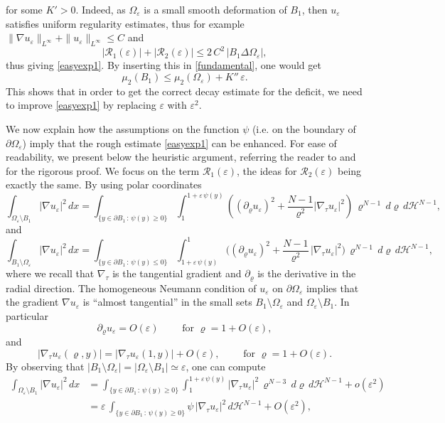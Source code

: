 \documentclass{amsart}
\theoremstyle{definition}
\numberwithin{equation}{section}
\begin{document}
for some $K'>0$. Indeed, as $\Omega_\varepsilon$ is a small smooth deformation of $B_1$, then $u_\varepsilon$ satisfies uniform regularity estimates, thus for example $\|\nabla u_\varepsilon\|_{L^\infty}+\|u_\varepsilon\|_{L^\infty}\le C$ and
\[
|\mathcal{R}_1(\varepsilon)|+|\mathcal{R}_2(\varepsilon)|\le 2\,C^2\, |B_1\Delta \Omega_\varepsilon|,
\]
thus giving \eqref{easyexp1}.
By inserting this in \eqref{fundamental}, one would get
\[
\mu_2(B_1)\leq \mu_2(\Omega_\varepsilon)+ K''\,\varepsilon.
\]
This shows that in order to get the correct decay estimate for the deficit, we need to improve \eqref{easyexp1} by replacing $\varepsilon$ with $\varepsilon^2$.
\par
We now explain how the assumptions on the function $\psi$ (i.e. on the boundary of $\partial\Omega_\varepsilon$) imply that the rough estimate \eqref{easyexp1} can be enhanced.
For ease of readability, we present below the heuristic argument, referring the reader to \cite[Section 6]{MR2899684} and \cite[Section 6]{MR2913683} for the rigorous proof.
We focus on the term $\mathcal{R}_1(\varepsilon)$, the ideas for $\mathcal{R}_2(\varepsilon)$ being exactly the same. By using polar coordinates
\[
\int_{\Omega_\varepsilon\setminus B_1}|\nabla u_\varepsilon|^2\, dx = \int_{\{y\in\partial B_1\,:\, \psi(y)\ge0 \}}\int_{1}^{1+\varepsilon\,\psi(y)}\left((\partial_\varrho u_\varepsilon)^2+\frac{N-1}{\varrho^2}|\nabla_\tau u_\varepsilon|^2\right)\,\varrho^{N-1}\,d\varrho\,d\mathcal{H}^{N-1},
\]
and
\[
\int_{B_1\setminus \Omega_\varepsilon}|\nabla u_\varepsilon|^2\, dx = \int_{\{y\in\partial B_1\,:\, \psi(y)\le0 \}}\int_{1+\varepsilon\,\psi(y)}^1\bigg((\partial_\varrho u_\varepsilon)^2+\frac{N-1}{\varrho^2}\,|\nabla_\tau u_\varepsilon|^2\bigg)\,\varrho^{N-1}\,d\varrho\,d\mathcal{H}^{N-1},
\]
where we recall that $\nabla_\tau$ is the tangential gradient and $\partial_\varrho$ is the derivative in the radial direction.
The homogeneous Neumann condition of $u_\varepsilon$ on $\partial \Omega_\varepsilon$ implies that the gradient $\nabla u_\varepsilon$ is ``almost tangential'' in the small sets $B_1\setminus \Omega_\varepsilon$ and $\Omega_\varepsilon\setminus B_1$. In particular
\[
\partial_\varrho u_\varepsilon=O(\varepsilon)\qquad \mbox{ for }\varrho =1+ O(\varepsilon),
\]
and
\[
|\nabla_\tau u_\varepsilon(\varrho,y)|=|\nabla_\tau u_\varepsilon(1,y)|+O(\varepsilon),\qquad \mbox{ for }\varrho = 1 + O(\varepsilon).
\]
By observing that $|B_1\setminus \Omega_\varepsilon| = |\Omega_\varepsilon\setminus B_1| \simeq \varepsilon$, one can compute
\[
\begin{split}
\int_{\Omega_\varepsilon\setminus B_1}|\nabla u_\varepsilon|^2\, dx
&=\int_{\{y\in\partial B_1\,:\, \psi(y)\ge0 \}}\int_1^{1+\varepsilon\,\psi(y)}|\nabla_\tau u_\varepsilon|^2\,\varrho^{N-3}\,d\varrho\,d\mathcal{H}^{N-1}+o(\varepsilon^2)\\
&=\varepsilon\,\int_{\{y\in\partial B_1\,:\, \psi(y)\ge0 \}}\psi\,|\nabla_\tau u_\varepsilon|^2\, d\mathcal{H}^{N-1}+O(\varepsilon^2),
\end{split}
\]
\end{document}
